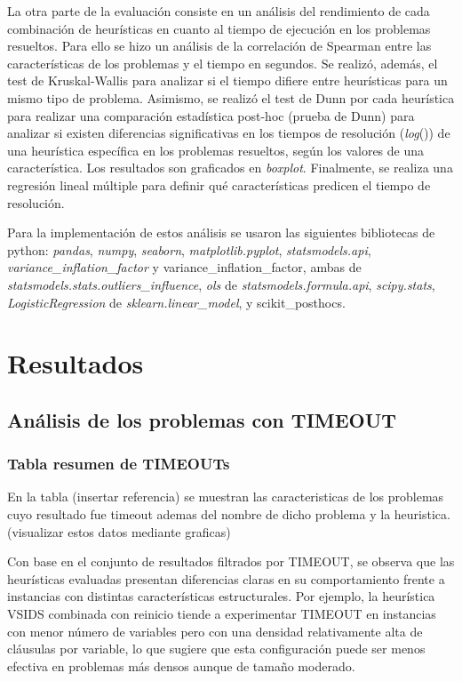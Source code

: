 La otra parte de la evaluaci\'on consiste en un an\'alisis del rendimiento de cada combinaci\'on de heur\'isticas en cuanto al tiempo de ejecuci\'on en los problemas resueltos. Para ello se hizo un an\'alisis de la correlaci\'on de Spearman entre las caracter\'isticas de los problemas y el tiempo en segundos. Se realiz\'o, adem\'as, el test de Kruskal-Wallis para analizar si el tiempo difiere entre heur\'isticas para un mismo tipo de problema. Asimismo, se realiz\'o el test de Dunn por cada heur\'istica para realizar una comparaci\'on estad\'istica post-hoc (prueba de Dunn) para analizar si existen diferencias significativas en los tiempos de resoluci\'on (\textit{log}()) de una heur\'istica espec\'ifica en los problemas resueltos, seg\'un los valores de una caracter\'istica. 
Los resultados son graficados en \textit{boxplot}. Finalmente, se realiza una regresi\'on lineal m\'ultiple para definir qu\'e caracter\'isticas predicen el tiempo de resoluci\'on.

Para la implementaci\'on de estos an\'alisis se usaron las siguientes bibliotecas de python: \textit{pandas}, \textit{numpy}, \textit{seaborn}, \textit{matplotlib.pyplot}, \textit{statsmodels.api}, \textit{variance\_inflation\_factor} y variance\_inflation\_factor, ambas de \textit{statsmodels.stats.outliers\_influence}, \textit{ols} de \textit{statsmodels.formula.api}, \textit{scipy.stats}, \textit{LogisticRegression} de \textit{sklearn.linear\_model}, y scikit\_posthocs.

\section{Resultados}
\subsection{An\'alisis de los problemas con TIMEOUT}

\subsubsection{Tabla resumen de TIMEOUTs}
En la tabla (insertar referencia) se muestran las caracteristicas de los problemas cuyo resultado fue timeout ademas del nombre de dicho problema y la heuristica. (visualizar estos datos mediante graficas)

Con base en el conjunto de resultados filtrados por TIMEOUT, se observa que las heurísticas evaluadas presentan diferencias claras en su comportamiento frente a instancias con distintas características estructurales. Por ejemplo, la heurística VSIDS combinada con reinicio tiende a experimentar TIMEOUT en instancias con menor número de variables pero con una densidad relativamente alta de cláusulas por variable, lo que sugiere que esta configuración puede ser menos efectiva en problemas más densos aunque de tamaño moderado. 

